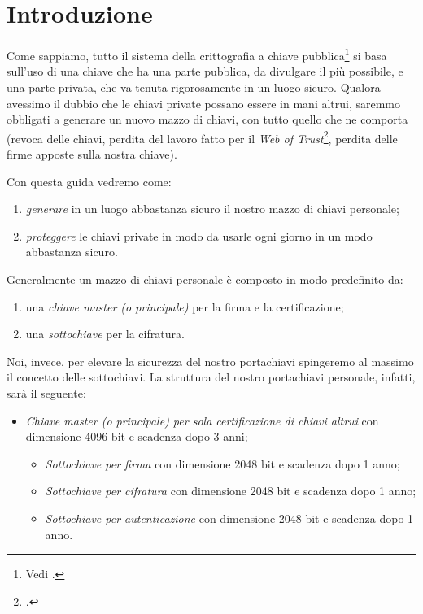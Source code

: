 \chapter{Introduzione}

Come sappiamo, tutto il sistema della crittografia a chiave
pubblica\footnote{Vedi \cite{wiki:crittografia}.} si basa sull'uso di una chiave
che ha una parte pubblica, da divulgare il più possibile, e una parte privata,
che va tenuta rigorosamente in un luogo sicuro. Qualora avessimo il dubbio che
le chiavi private possano essere in mani altrui, saremmo obbligati a generare un
nuovo mazzo di chiavi, con tutto quello che ne comporta (revoca delle chiavi,
perdita del lavoro fatto per il \emph{Web of
Trust}\footnote{\cite{wiki:webtrust}.}, perdita delle firme apposte sulla nostra
chiave).

Con questa guida vedremo come:

\begin{enumerate}
  \item \emph{generare} in un luogo abbastanza sicuro il nostro mazzo di chiavi
  personale;
  \item \emph{proteggere} le chiavi private in modo da usarle ogni giorno in un
 modo abbastanza sicuro.
\end{enumerate}

Generalmente un mazzo di chiavi personale è composto in modo predefinito da:

\begin{enumerate}
  \item una \emph{chiave master (o principale)} per la firma e la
  certificazione;
  \item una \emph{sottochiave} per la cifratura.
\end{enumerate}

Noi, invece, per elevare la sicurezza del nostro portachiavi spingeremo al
massimo il concetto delle sottochiavi. La struttura del nostro portachiavi
personale, infatti, sarà il seguente:

\begin{itemize}
  \item \emph{Chiave master (o principale) per sola certificazione di chiavi
  altrui} con dimensione 4096 bit e scadenza dopo 3 anni;
  \begin{itemize}
    \item \emph{Sottochiave per firma} con dimensione 2048 bit e scadenza dopo 1
    anno;
    \item \emph{Sottochiave per cifratura} con dimensione 2048 bit e scadenza
    dopo 1 anno;
    \item \emph{Sottochiave per autenticazione} con dimensione 2048 bit e
    scadenza dopo 1 anno.
  \end{itemize}
\end{itemize}

